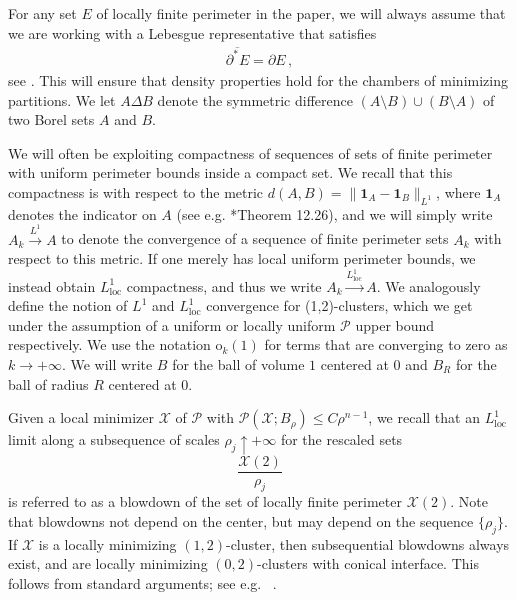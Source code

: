 \documentclass[10pt,reqno]{amsart}
\numberwithin{equation}{section}
\theoremstyle{definition}
\newcommand{\Pcal}{\mathcal{P}}
\newcommand{\loc}{\mathrm{loc}}
\newcommand{\X}{\mathcal{X}}
\begin{document}
 For any set $E$ of locally finite perimeter in the paper, we will always assume that we are working with a Lebesgue representative that satisfies 
\begin{align}\label{eq:norm choice}
\overline{\partial^* E} = \partial E\,,  
\end{align}
see \cite[Proposition 12.19]{Mag12}. This will ensure that density properties hold for the chambers of minimizing partitions.
{We let $A\Delta B$ denote the symmetric difference $(A\setminus B)\cup (B\setminus A)$ of two Borel sets $A$ and $B$.}

We will often be exploiting compactness of sequences of sets of finite perimeter with uniform perimeter bounds inside a compact set. We recall that this compactness is with respect to the metric $d(A,B) = \|\mathbf{1}_A - \mathbf{1}_B\|_{L^1}$, where $\mathbf{1}_A$ denotes the indicator on $A$ (see e.g. \cite{Mag12}*{Theorem 12.26}), and we will simply write $A_k \overset{L^1}{\to} A$ to denote the convergence of a sequence of finite perimeter sets $A_k$ with respect to this metric. If one merely has local uniform perimeter bounds, we instead obtain $L^1_\loc$ compactness, {and thus we write $A_k \overset{L^1_\loc}{\to} A$}. We analogously define the notion of $L^1$ and $L^1_\loc$ convergence for (1,2)-clusters, which we get under the assumption of a uniform or locally uniform $\Pcal$ upper bound respectively. We use the notation $\mathrm{o}_k(1)$ for terms that are converging to zero as $k \to +\infty$. We will write $B$ for the ball of volume $1$ centered at $0$ and $B_R$ for the ball of radius $R$ centered at $0$.

Given a local minimizer $\X$ of $\Pcal$ with $\Pcal(\X;B_\rho) \leq C \rho^{n-1}$, we recall that an $L^1_\loc$ limit along a subsequence of scales $\rho_j \uparrow +\infty$ for the rescaled sets
\[
    \frac{\X(2)}{\rho_j}
\]
is referred to as a blowdown of the set of {locally} finite perimeter $\X(2)$. Note that blowdowns not depend on the center, but may depend on the sequence $\{\rho_j\}$. If $\X$ is a locally minimizing $(1,2)$-cluster, then subsequential blowdowns always exist, and are locally minimizing $(0,2)$-clusters with conical interface. This follows from standard arguments; see e.g.~ \cite[Lemma 4.1, Corollary 4.6]{BroNov24}.
\end{document}

